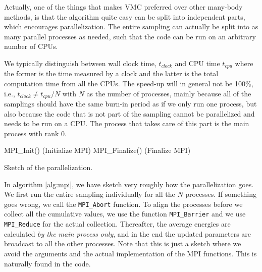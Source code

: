 Actually, one of the things that makes VMC preferred over other many-body methods, is that the algorithm quite easy can be split into independent parts, which encourages parallelization. The entire sampling can actually be split into as many parallel processes as needed, such that the code can be run on an arbitrary number of CPUs. 

We typically distinguish between wall clock time, $t_{clock}$ and CPU time $t_{cpu}$ where the former is the time measured by a clock and the latter is the total computation time from all the CPUs. The speed-up will in general not be 100\%, i.e., $t_{clock}\neq t_{cpu}/N$ with $N$ as the number of processes, mainly because all of the samplings should have the same burn-in period as if we only run one process, but also because the code that is not part of the sampling cannot be parallelized and needs to be run on a CPU. The process that takes care of this part is the main process with rank 0.

\IncMargin{1em}
\begin{algorithm}
	\SetAlgoLined
	MPI\_Init() (Initialize MPI)\;
	MPI\_Finalize() (Finalize MPI)\;
	\caption{Sketch of the parallelization.}
	\label{alg:mpi}
\end{algorithm}\DecMargin{1em}

In algorithm \ref{alg:mpi}, we have sketch very roughly how the parallelization goes. We first run the entire sampling individually for all the $N$ processes. If something goes wrong, we call the \lstinline|MPI_Abort| function. To align the processes before we collect all the cumulative values, we use the function \lstinline|MPI_Barrier| and we use \lstinline|MPI_Reduce| for the actual collection. Thereafter, the average energies are calculated \textit{by the main process only}, and in the end the updated parameters are broadcast to all the other processes. Note that this is just a sketch where we avoid the arguments and the actual implementation of the MPI functions. This is naturally found in the code. 

